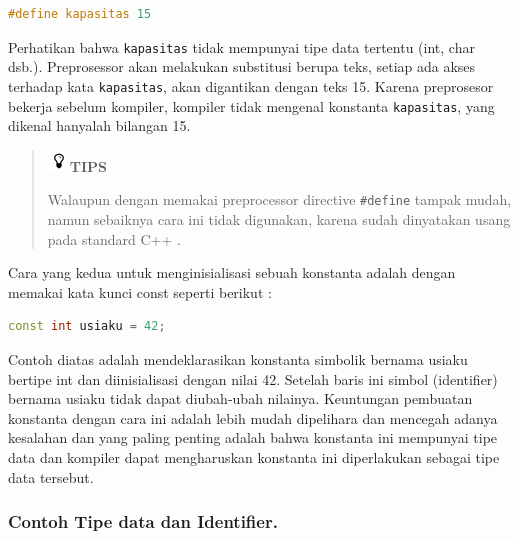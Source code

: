 \begin{lstlisting}[language=c++, numbers=none]
#define kapasitas 15
\end{lstlisting}

Perhatikan bahwa \texttt{kapasitas} tidak mempunyai tipe data tertentu
(int, char dsb.). Preprosessor akan melakukan substitusi berupa teks,
setiap ada akses terhadap kata \texttt{kapasitas}, akan digantikan
dengan teks 15. Karena preprosesor bekerja sebelum kompiler, kompiler
tidak mengenal konstanta \texttt{kapasitas}, yang dikenal hanyalah
bilangan 15.

\begin{quotation}
\includegraphics{../manuscript/images/tips.png}\textbf{TIPS} 

Walaupun
dengan memakai preprocessor directive \texttt{\#define} tampak mudah,
namun sebaiknya cara ini tidak digunakan, karena sudah dinyatakan usang
pada standard C++ .
\end{quotation}
 

Cara yang kedua untuk menginisialisasi sebuah konstanta adalah dengan
memakai kata kunci const seperti berikut :

\begin{lstlisting}[language=c++, numbers=none]
const int usiaku = 42;
\end{lstlisting}

Contoh diatas adalah mendeklarasikan konstanta simbolik bernama usiaku
bertipe int dan diinisialisasi dengan nilai 42. Setelah baris ini simbol
(identifier) bernama usiaku tidak dapat diubah-ubah nilainya. Keuntungan
pembuatan konstanta dengan cara ini adalah lebih mudah dipelihara dan
mencegah adanya kesalahan dan yang paling penting adalah bahwa konstanta
ini mempunyai tipe data dan kompiler dapat mengharuskan konstanta ini
diperlakukan sebagai tipe data tersebut.

\subsubsection*{Contoh Tipe data dan Identifier.}

